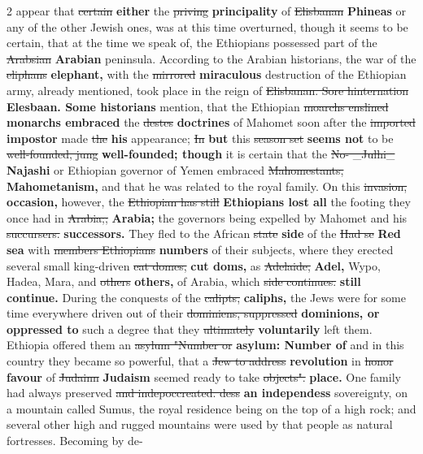 \documentclass[10pt]{article}
\begin{document}
\begin{multicols}{2}
appear that \sout{certain} \textbf{either} the \sout{priving} \textbf{principality} of \sout{Elisbanan} \textbf{Phineas} or any of the other Jewish ones, was at this time overturned, though it seems to be certain, that at the time we speak of, the Ethiopians possessed part of the \sout{Arabsian} \textbf{Arabian} peninsula. According to the Arabian historians, the war of the \sout{eliphans} \textbf{elephant,} with the \sout{mirrored} \textbf{miraculous} destruction of the Ethiopian army, already mentioned, took place in the reign of \sout{Elisbanan. Sore hinternation} \textbf{Elesbaan. Some historians} mention, that the Ethiopian \sout{moarchs enslined} \textbf{monarchs embraced} the \sout{destes} \textbf{doctrines} of Mahomet soon after the \sout{imported} \textbf{impostor} made \sout{the} \textbf{his} appearance; \sout{In} \textbf{but} this \sout{season set} \textbf{seems not} to be \sout{well-founded, jung} \textbf{well-founded; though} it is certain that the \sout{No- \_Julhi\_} \textbf{Najashi} or Ethiopian governor of Yemen embraced \sout{Mahomestants,} \textbf{Mahometanism,} and that he was related to the royal family. On this \sout{invasion,} \textbf{occasion,} however, the \sout{Ethiopian has still} \textbf{Ethiopians lost all} the footing they once had in \sout{Arabia;;} \textbf{Arabia;} the governors being expelled by Mahomet and his \sout{succursers.} \textbf{successors.} They fled to the African \sout{state} \textbf{side} of the \sout{Had se} \textbf{Red sea} with \sout{members Ethiopians} \textbf{numbers} of their subjects, where they erected several small king-driven \sout{eat domes,} \textbf{cut doms,} as \sout{Adelaide,} \textbf{Adel,} Wypo, Hadea, Mara, and \sout{others} \textbf{others,} of Arabia, which \sout{side continues.} \textbf{still continue.} During the conquests of the \sout{calipts,} \textbf{caliphs,} the Jews were for some time everywhere driven out of their \sout{dominiens, suppressed} \textbf{dominions, or oppressed to} such a degree that they \sout{ultimately} \textbf{voluntarily} left them. Ethiopia offered them an \sout{asylum "Number or} \textbf{asylum: Number of} and in this country they became so powerful, that a \sout{Jew to address} \textbf{revolution} in \sout{honor} \textbf{favour} of \sout{Judainn} \textbf{Judaism} seemed ready to take \sout{objects".} \textbf{place.} One family had always preserved \sout{and indepoccreated. dess} \textbf{an independess} sovereignty, on a mountain called Sumus, the royal residence being on the top of a high rock; and several other high and rugged mountains were used by that people as natural fortresses. Becoming by de-
\end{multicols}
\end{document}
